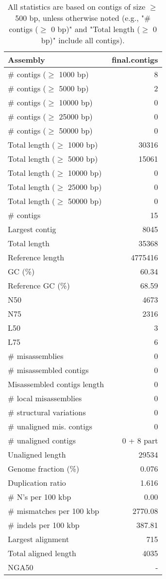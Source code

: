 \documentclass[12pt,a4paper]{article}
\begin{document}
\begin{table}[ht]
\begin{center}
\caption{All statistics are based on contigs of size $\geq$ 500 bp, unless otherwise noted (e.g., "\# contigs ($\geq$ 0 bp)" and "Total length ($\geq$ 0 bp)" include all contigs).}
\begin{tabular}{|l*{1}{|r}|}
\hline
Assembly & final.contigs \\ \hline
\# contigs ($\geq$ 1000 bp) & 8 \\ \hline
\# contigs ($\geq$ 5000 bp) & 2 \\ \hline
\# contigs ($\geq$ 10000 bp) & 0 \\ \hline
\# contigs ($\geq$ 25000 bp) & 0 \\ \hline
\# contigs ($\geq$ 50000 bp) & 0 \\ \hline
Total length ($\geq$ 1000 bp) & 30316 \\ \hline
Total length ($\geq$ 5000 bp) & 15061 \\ \hline
Total length ($\geq$ 10000 bp) & 0 \\ \hline
Total length ($\geq$ 25000 bp) & 0 \\ \hline
Total length ($\geq$ 50000 bp) & 0 \\ \hline
\# contigs & 15 \\ \hline
Largest contig & 8045 \\ \hline
Total length & 35368 \\ \hline
Reference length & 4775416 \\ \hline
GC (\%) & 60.34 \\ \hline
Reference GC (\%) & 68.59 \\ \hline
N50 & 4673 \\ \hline
N75 & 2316 \\ \hline
L50 & 3 \\ \hline
L75 & 6 \\ \hline
\# misassemblies & 0 \\ \hline
\# misassembled contigs & 0 \\ \hline
Misassembled contigs length & 0 \\ \hline
\# local misassemblies & 0 \\ \hline
\# structural variations & 0 \\ \hline
\# unaligned mis. contigs & 0 \\ \hline
\# unaligned contigs & 0 + 8 part \\ \hline
Unaligned length & 29534 \\ \hline
Genome fraction (\%) & 0.076 \\ \hline
Duplication ratio & 1.616 \\ \hline
\# N's per 100 kbp & 0.00 \\ \hline
\# mismatches per 100 kbp & 2770.08 \\ \hline
\# indels per 100 kbp & 387.81 \\ \hline
Largest alignment & 715 \\ \hline
Total aligned length & 4035 \\ \hline
NGA50 & - \\ \hline
\end{tabular}
\end{center}
\end{table}
\end{document}
